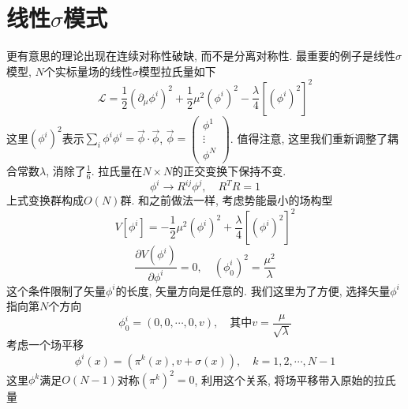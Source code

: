 \documentclass[a4paper,11pt]{article}
\begin{document}
\section{线性$\sigma$模式}
更有意思的理论出现在连续对称性破缺, 而不是分离对称性. 最重要的例子是线性$\sigma$模型, $N$个实标量场的线性$\sigma$模型拉氏量如下
\begin{equation*}
  \mathcal{L}=\frac{1}{2}(\partial_\mu\phi^i)^2+\frac{1}{2}\mu^2(\phi^i)^2-\frac{\lambda}{4}[(\phi^i)^2]^2
\end{equation*}
这里$(\phi^i)^2$表示$\sum_{i}\phi^i\phi^i=\vec{\phi}\cdot\vec{\phi}$, $\vec{\phi}=\begin{pmatrix}
                                                                                         \phi^1 \\
                                                                                         \vdots \\
                                                                                         \phi^N
                                                                                       \end{pmatrix}$. 值得注意, 这里我们重新调整了耦合常数$\lambda$, 消除了$\frac{1}{6}$. 拉氏量在$N\times N$的正交变换下保持不变.
\begin{equation*}
  \phi^i\rightarrow R^{ij}\phi^j,\quad R^TR=1
\end{equation*}
上式变换群构成$O(N)$群. 和之前做法一样, 考虑势能最小的场构型
\begin{equation*}
  V[\phi^i]=-\frac{1}{2}\mu^2(\phi^i)^2+\frac{\lambda}{4}[(\phi^i)^2]^2
\end{equation*}
\begin{equation*}
  \frac{\partial V(\phi^i)}{\partial\phi^i}=0,\quad (\phi_0^i)^2=\frac{\mu^2}{\lambda}
\end{equation*}
这个条件限制了矢量$\phi^i$的长度, 矢量方向是任意的. 我们这里为了方便, 选择矢量$\phi^i$指向第$N$个方向
\begin{equation*}
  \phi_0^i=(0,0,\cdots,0,v),\quad\text{其中}v=\frac{\mu}{\sqrt{\lambda}}
\end{equation*}
考虑一个场平移
\begin{equation*}
  \phi^i(x)=(\pi^k(x),v+\sigma(x)),\quad k=1,2,\cdots,N-1
\end{equation*}
这里$\phi^k$满足$O(N-1)$对称$(\pi^k)^2=0$, 利用这个关系, 将场平移带入原始的拉氏量
\end{document}
